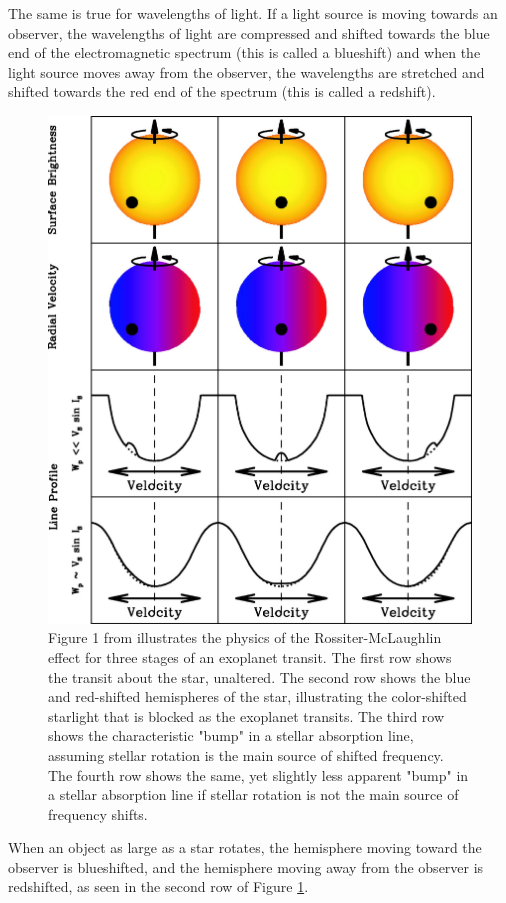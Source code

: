 \documentclass[oneside,12pt]{amsart}
\numberwithin{page}{section}
\begin{document}
The same is true for wavelengths of light. If a light source is moving towards an observer, the wavelengths of light are compressed and shifted towards the blue end of the electromagnetic spectrum (this is called a blueshift) and when the light source moves away from the observer, the wavelengths are stretched and shifted towards the red end of the spectrum (this is called a redshift).

\begin{figure}[htbp]
    \centering
    \includegraphics[width=0.7\linewidth]{figs/gaudi_fig1.jpg}
    \caption{Figure 1 from \citep{gaudi2007prospects} illustrates the physics of the Rossiter-McLaughlin effect for three stages of an exoplanet transit. The first row shows the transit about the star, unaltered. The second row shows the blue and red-shifted hemispheres of the star, illustrating the color-shifted starlight that is blocked as the exoplanet transits. The third row shows the characteristic "bump" in a stellar absorption line, assuming stellar rotation is the main source of shifted frequency. The fourth row shows the same, yet slightly less apparent "bump" in a stellar absorption line if stellar rotation is not the main source of frequency shifts.}
    \label{fig:gaudi-fig1}
\end{figure}

When an object as large as a star rotates, the hemisphere moving toward the observer is blueshifted, and the hemisphere moving away from the observer is redshifted, as seen in the second row of Figure \ref{fig:gaudi-fig1}. 
\end{document}
